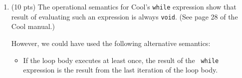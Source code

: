 \documentclass[10pt]{article}
\newcommand{\ttmath}[1]{$\mathtt{#1}$}
\newcommand{\ossimple}[6]{#1,#2,#3\vdash #4 : #5,#6}
\newcommand{\osrule}[8]{\frac{#7}{\ossimple{#1}{#2}{#3}{#4}{#5}{#6}}\eqno
  \mbox{#8}}
\begin{document}
\begin{enumerate}
Write the operational semantics for these three syntactic constructs. You
may find it helpful to think of an array of type $T[n]$ as an object with
$n$ attributes of type $T$.\\ \\
\texttt{let a:T[\ttmath{e_1}] in \ttmath{e_2}} \\
$$\osrule{so}{E}{S_1} {let\ a:T[e_1]\ in\ e_2}{v_2}{S_4}
  {\begin{array}{l} \ossimple{so}{S_1}{E}{T[e_1]}{void}{S_2}\\
  \textrm{$l_{1}=newloc(S_2)$}  \\
  \textrm{$S_{3}={S_2}[void/{l_1}$]} \\
  \textrm{$E'={E}[{l_1} / a$]} \\
  \ossimple{so}{E'}{S_3}{e_2}{void}{S_4} \\
   \end{array}}{[Let-Array]}
$$
\\ 
\texttt{a[\ttmath{e_1}] <- \ttmath{e_2}}\\

$$\osrule{so}{E}{S} {a[e_1]<-\ e_2}{v}{S}
  {\begin{array}{l}
  \ossimple{so}{E}{S_1}{e_2}{v}{S_2} \\
  \textrm{$E(a[e_1])=I_a$}\\
   \end{array}}{[Assign-Array]}
$$
\\ \texttt{a[e]} \\
$$\osrule{so}{E}{S_1} {a[e]}{v}{S}
  {\begin{array}{l}
  \textrm{$E(a[e])=I_a$}\\
  \textrm{$S(I_a)=v_a$}\\
   \end{array}}{[Reference-Array]}
$$

\pagebreak

\item (10 pts)
The operational semantics for Cool's {\tt while} expression show that
result of evaluating such an expression is always {\tt void}.  (See page
28 of the Cool manual.)

However, we could have used the following alternative semantics:

\begin{itemize}

\item If the loop body executes at least once, the result of the {\tt
while} expression is the result from the last iteration of the loop body.


\end{itemize}
\end{enumerate}
\end{document}
